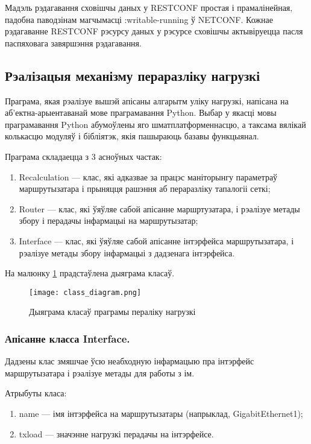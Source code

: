 Мадэль рэдагавання сховішчы даных у RESTCONF простая і прамалінейная, падобна паводзінам магчымасці :writable-running ў NETCONF. Кожнае рэдагаванне RESTCONF рэсурсу даных у рэсурсе сховішчы актывіруецца пасля паспяховага завяршэння рэдагавання.

\subsection{Рэалізацыя механізму пераразліку нагрузкі}

Праграма, якая рэалізуе вышэй апісаны алгарытм уліку нагрузкі, напісана
на аб'ектна-арыентаванай мове праграмавання Python. Выбар у якасці мовы праграмавання
Python абумоўлены яго шматплатформеннасцю, а таксама вялікай колькасцю модуляў і бібліятэк, якія пашыраюць базавы функцыянал.

Праграма складаецца з 3 асноўных частак:
\begin{enumerate}
    \item Recalculation --- клас, які адказвае за працэс маніторынгу параметраў маршрутызатара і прыняцця рашэння аб
    пераразліку тапалогіі сеткі;
    \item Router --- клас, які ўяўляе сабой апісанне маршртузатара, і рэалізуе
    метады збору і перадачы інфармацыі на маршрутызатар;
    \item Interface --- клас, які ўяўляе сабой апісанне інтэрфейса маршрутызатара,
    і рэалізуе метады збору інфармацыі з дадзенага інтэрфейса.
\end{enumerate}

На малюнку \ref{uml: Class Diagram} прадстаўлена дыяграма класаў.

\clearpage

\begin{figure}[ht!]
    \centering
    \texttt{[image: class\_diagram.png]}
    \caption{Дыяграма класаў праграмы пераліку нагрузкі}
    \label{uml: Class Diagram}
\end{figure}

\vspace{-\baselineskip}

\subsubsection{Апісанне класса Interface.}

Дадзены клас змяшчае ўсю неабходную інфармацыю пра інтэрфейс маршрутызатара і
рэалізуе метады для работы з ім.

Атрыбуты класа:
\begin{enumerate}
    \item name --- імя інтэрфейса на маршрутызатары (напрыклад, GigabitEthernet1);
    \item txload --- значэнне нагрузкі перадачы на інтэрфейсе.
\end{enumerate}

